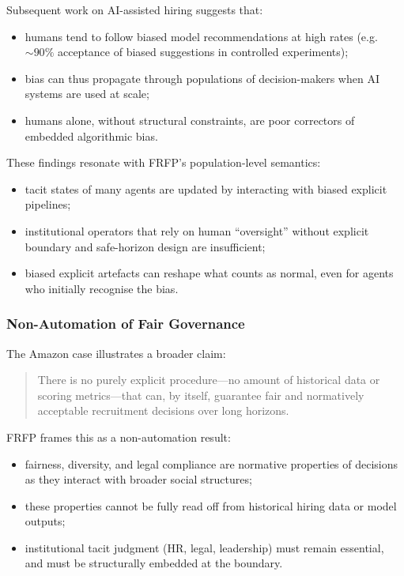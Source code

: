 Subsequent work on AI-assisted hiring suggests that:

\begin{itemize}
  \item humans tend to follow biased model recommendations at high rates
        (e.g.\ $\sim 90\%$ acceptance of biased suggestions in controlled
        experiments);
  \item bias can thus propagate through populations of decision-makers when
        AI systems are used at scale;
  \item humans alone, without structural constraints, are poor correctors of
        embedded algorithmic bias.
\end{itemize}

These findings resonate with FRFP’s population-level semantics:

\begin{itemize}
  \item tacit states of many agents are updated by interacting with biased
        explicit pipelines;
  \item institutional operators that rely on human ``oversight'' without
        explicit boundary and safe-horizon design are insufficient;
  \item biased explicit artefacts can reshape what counts as normal,
        even for agents who initially recognise the bias.
\end{itemize}

\subsubsection*{Non-Automation of Fair Governance}

The Amazon case illustrates a broader claim:

\begin{quote}
  There is no purely explicit procedure---no amount of historical data or
  scoring metrics---that can, by itself, guarantee fair and normatively
  acceptable recruitment decisions over long horizons.
\end{quote}

FRFP frames this as a non-automation result:

\begin{itemize}
  \item fairness, diversity, and legal compliance are normative properties
        of decisions as they interact with broader social structures;
  \item these properties cannot be fully read off from historical hiring data
        or model outputs;
  \item institutional tacit judgment (HR, legal, leadership) must remain
        essential, and must be structurally embedded at the boundary.
\end{itemize}


